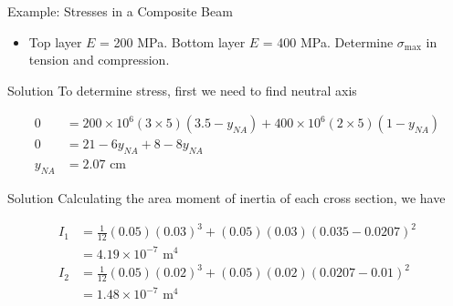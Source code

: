 \documentclass[10pt, svgnames]{beamer}
\begin{document}
\begin{frame}[label={sec:orgbc48d3a}]{Example: Stresses in a Composite Beam}
\begin{itemize}
\item Top layer \(E\) = 200 MPa. Bottom layer \(E\) = 400 MPa. Determine
\(\sigma_{\max}\) in tension and compression.
\end{itemize}

\begin{figure}[hbtp]
  \centering
\end{figure}
\end{frame}

\begin{frame}[label={sec:orgf441077}]{Solution}
To determine stress, first we need to find neutral axis

\begin{align*}
    0 &= 200 \times {10^6}(3 \times 5)(3.5 - y_{NA}) + 400 \times {10^6}(2 \times 5)(1 - y_{NA}) \\
    0 &= 21 - 6y_{NA} + 8 - 8y_{NA} \\
    y_{NA} &= 2.07 \text{ cm}
\end{align*}
\end{frame}

\begin{frame}[label={sec:org444c8b0}]{Solution}
Calculating the area moment of inertia of each cross section, we have

\begin{align*}
    I_1 &= \frac{1}{12}(0.05)(0.03)^3 + (0.05)(0.03)(0.035 - 0.0207)^{2} \\
        &= 4.19 \times 10^{-7} \text{ m}^4 \\
    I_2 &= \frac{1}{12}(0.05)(0.02)^3 + (0.05)(0.02)(0.0207 - 0.01)^{2} \\
        &= 1.48 \times 10^{ -7} \text{ m}^4
\end{align*}
\end{frame}
\end{document}
